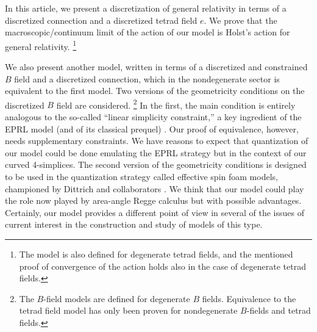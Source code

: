 \documentclass{article}
\begin{document}
In this article, we present a discretization of general relativity in terms of a discretized connection and a discretized tetrad field $e$. We prove that the macroscopic/continuum limit of the action of our model is Holst's action for general relativity.%
\footnote{The model is also defined for degenerate tetrad fields, 
and the mentioned proof of convergence of the action holds also in the case of degenerate tetrad fields.}


We also present another model, written in terms of a discretized and constrained $B$ field and a discretized connection, which in the nondegenerate sector is equivalent to the first model. Two versions of the geometricity conditions on the discretized $B$ field are considered.%
\footnote{The $B$-field models are defined for degenerate $B$ fields. Equivalence to the tetrad field model has only been proven for nondegenerate $B$-fields and tetrad fields.} 
In the first, the main condition is entirely analogous to the so-called ``linear simplicity constraint,'' a key ingredient of the EPRL model (and of its classical prequel) \cite{EPRL}. Our proof of equivalence, however, needs supplementary constraints. 
We have reasons to expect that quantization of our model could be done emulating the EPRL strategy but in the context of our curved 4-simplices. 
The second version of the geometricity conditions is designed to be used in the quantization strategy called effective spin foam models, championed by Dittrich and collaborators \cite{ESFM1}. We think that our model could play the role now played by area-angle Regge calculus but with possible advantages. Certainly, our model provides a different point of view in several of the issues of current interest in the construction and study of models of this type. 

%
\end{document}
